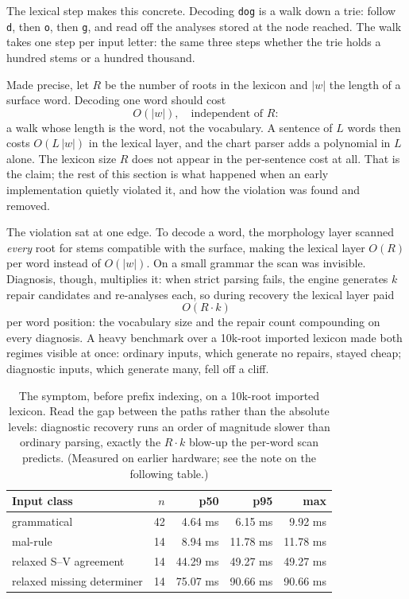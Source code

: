 \documentclass[11pt]{article}
\theoremstyle{definition}
\theoremstyle{plain}
\theoremstyle{remark}
\begin{document}
The lexical step makes this concrete. Decoding \texttt{dog} is a walk down a trie:
follow \texttt{d}, then \texttt{o}, then \texttt{g}, and read off the analyses
stored at the node reached. The walk takes one step per input letter: the same
three steps whether the trie holds a hundred stems or a hundred thousand.

Made precise, let $R$ be the number of roots in the lexicon and $|w|$ the length
of a surface word. Decoding one word should cost
\[
  O(|w|), \quad\text{independent of } R:
\]
a walk whose length is the word, not the vocabulary. A sentence of $L$ words then
costs $O(L\,|w|)$ in the lexical layer, and the chart parser adds a polynomial in
$L$ alone. The lexicon size $R$ does not appear in the per-sentence cost at all.
That is the claim; the rest of this section is what happened when an early
implementation quietly violated it, and how the violation was found and removed.

The violation sat at one edge. To decode a word, the morphology layer scanned
\emph{every} root for stems compatible with the surface, making the lexical layer
$O(R)$ per word instead of $O(|w|)$. On a small grammar the scan was invisible.
Diagnosis, though, multiplies it: when strict parsing fails, the engine generates
$k$ repair candidates and re-analyses each, so during recovery the lexical layer
paid
\[
  O(R \cdot k)
\]
per word position: the vocabulary size and the repair count compounding on every
diagnosis. A heavy benchmark over a 10k-root imported lexicon made both regimes
visible at once: ordinary inputs, which generate no repairs, stayed cheap;
diagnostic inputs, which generate many, fell off a cliff.

\begin{table}[h]
\centering
\begin{tabular}{@{}lrrrr@{}}
\toprule
Input class & $n$ & p50 & p95 & max \\
\midrule
grammatical                 & 42 & 4.64 ms & 6.15 ms & 9.92 ms \\
mal-rule                    & 14 & 8.94 ms & 11.78 ms & 11.78 ms \\
relaxed S--V agreement      & 14 & 44.29 ms & 49.27 ms & 49.27 ms \\
relaxed missing determiner  & 14 & 75.07 ms & 90.66 ms & 90.66 ms \\
\bottomrule
\end{tabular}
\caption{The symptom, before prefix indexing, on a 10k-root imported lexicon. Read
the gap between the paths rather than the absolute levels: diagnostic recovery runs
an order of magnitude slower than ordinary parsing, exactly the $R\cdot k$ blow-up
the per-word scan predicts. (Measured on earlier hardware; see the note on the
following table.)}
\end{table}
\end{document}
